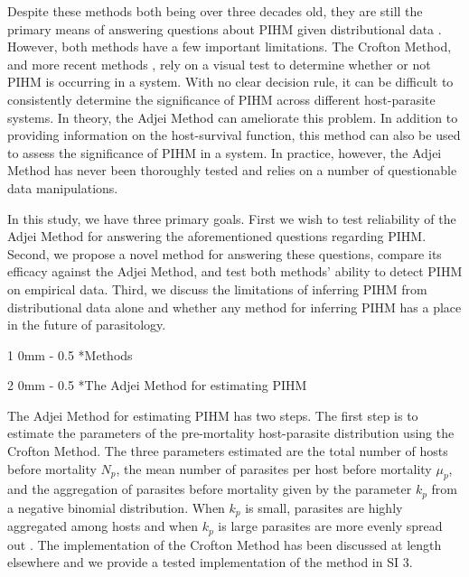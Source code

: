 \documentclass[12pt, a4paper]{article}
\makeatletter
\renewcommand{\section}{\@startsection
{section}%
{1}%
{0mm}%
{-\baselineskip}%
{0.5\baselineskip}%
{\normalfont\bf\large}} %
\renewcommand{\subsection}{\@startsection
{subsection}%
{2}%
{0mm}%
{-\baselineskip}%
{0.5\baselineskip}%
{\normalfont\bf}} %
\makeatother
\begin{document}
Despite these methods both being over three decades old, they are still the
primary means of answering questions about PIHM given distributional data
\citep[but see][for an alternative to the Crofton
Method]{Ferguson2011}. However, both methods have a few important limitations.
The Crofton Method, and more recent methods \citep{Ferguson2011},
rely on a visual test to determine whether or not PIHM is occurring in a
system.  With no clear decision rule, it can be difficult to consistently determine the
significance of PIHM across different host-parasite systems. In theory, the Adjei Method can ameliorate this problem. In addition to providing information on the host-survival function, this method can also be used to assess the significance of
PIHM in a system.
In practice, however, the Adjei Method has never been thoroughly tested and
relies on a number of questionable data manipulations.

In this study, we have
three primary goals. First we wish to test reliability of the Adjei Method for
answering the aforementioned questions regarding PIHM.  Second, we propose a
novel method for answering these questions, compare its efficacy against the Adjei Method, and test both methods' ability to detect PIHM on empirical data.  Third, we
discuss the limitations of inferring PIHM from distributional data alone and
whether any method for inferring PIHM has a place in the future of
parasitology.

\section*{Methods}

\subsection*{The Adjei Method for estimating PIHM}

The Adjei Method for estimating PIHM has two steps.  The first
step is to estimate the parameters of the pre-mortality host-parasite
distribution using the Crofton Method.  The three parameters estimated are the
total number of hosts before mortality $N_p$,  the mean number of parasites per
host before mortality $\mu_p$, and the aggregation of parasites before
mortality given by the parameter $k_p$ from a negative binomial distribution.
When $k_p$ is small, parasites are highly aggregated among hosts and when
$k_p$ is large parasites are more evenly spread out \citep{Wilson2002}.  The implementation of the Crofton Method has been discussed at length elsewhere \citep[e.g.][]{Royce1990,Lester1984} and we provide a tested implementation of the method in SI 3.
\end{document}
